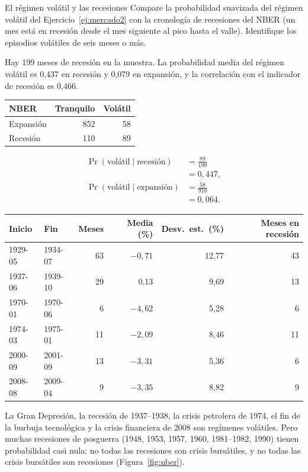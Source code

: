 \begin{ejresuelto}{El régimen volátil y las recesiones}\label{ej:nber}
\enunciado Compare la probabilidad suavizada del régimen volátil del Ejercicio~\ref{ej:mercado2} con la cronología de recesiones del
NBER (un mes está en recesión desde el mes siguiente al pico hasta el valle). Identifique los episodios volátiles de seis meses
o más.

\solucion
{} Hay 199 meses de recesión en la muestra. La probabilidad media del régimen volátil es 0,437 en
recesión y 0,079 en expansión, y la correlación con el indicador de recesión es 0,466.
\begin{center}\small
\begin{tabular}{@{}lrr@{}}
\toprule
NBER & Tranquilo & Volátil \\
\midrule
Expansión & 852 & 58 \\
Recesión & 110 & 89 \\
\bottomrule
\end{tabular}
\end{center}
\begin{align*}
  \Pr(\text{volátil}\mid\text{recesión}) &= \frac{89}{199}\\
                                       &= 0{,}447,\\
  \Pr(\text{volátil}\mid\text{expansión}) &= \frac{58}{910}\\
                                        &= 0{,}064 .
\end{align*}

\begin{center}\small
\begin{tabular}{@{}llrrrr@{}}
\toprule
Inicio & Fin & Meses & Media (\%) & Desv.\ est.\ (\%) & Meses en recesión \\
\midrule
1929-05 & 1934-07 & 63 & $-0{,}71$ & 12,77 & 43 \\
1937-06 & 1939-10 & 29 & 0,13 & 9,69 & 13 \\
1970-01 & 1970-06 & 6 & $-4{,}62$ & 5,28 & 6 \\
1974-03 & 1975-01 & 11 & $-2{,}09$ & 8,46 & 11 \\
2000-09 & 2001-09 & 13 & $-3{,}31$ & 5,36 & 6 \\
2008-08 & 2009-04 & 9 & $-3{,}35$ & 8,82 & 9 \\
\bottomrule
\end{tabular}
\end{center}
La Gran Depresión, la recesión de 1937--1938, la crisis petrolera de 1974, el fin de la burbuja tecnológica y la crisis
financiera de 2008 son regímenes volátiles. Pero muchas recesiones de posguerra (1948, 1953, 1957, 1960, 1981--1982, 1990)
tienen probabilidad casi nula: no todas las recesiones son crisis bursátiles, y no todas las crisis bursátiles son recesiones
(Figura~\ref{fig:nber}).


\end{ejresuelto}
